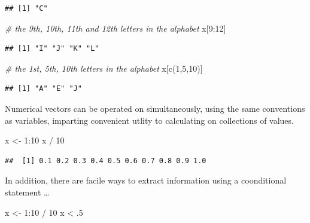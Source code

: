 \documentclass[
]{book}
\newenvironment{Shaded}{\begin{snugshade}}{\end{snugshade}}
\newcommand{\CommentTok}[1]{\textcolor[rgb]{0.56,0.35,0.01}{\textit{#1}}}
\newcommand{\DecValTok}[1]{\textcolor[rgb]{0.00,0.00,0.81}{#1}}
\newcommand{\FunctionTok}[1]{\textcolor[rgb]{0.00,0.00,0.00}{#1}}
\newcommand{\NormalTok}[1]{#1}
\newcommand{\OtherTok}[1]{\textcolor[rgb]{0.56,0.35,0.01}{#1}}
\newcommand{\SpecialCharTok}[1]{\textcolor[rgb]{0.00,0.00,0.00}{#1}}
\begin{document}
\begin{verbatim}
## [1] "C"
\end{verbatim}

\begin{Shaded}
\begin{Highlighting}[]
\CommentTok{\# the 9th, 10th, 11th and 12th letters in the alphabet}
\NormalTok{x[}\DecValTok{9}\SpecialCharTok{:}\DecValTok{12}\NormalTok{]}
\end{Highlighting}
\end{Shaded}

\begin{verbatim}
## [1] "I" "J" "K" "L"
\end{verbatim}

\begin{Shaded}
\begin{Highlighting}[]
\CommentTok{\# the 1st, 5th, 10th letters in the alphabet}
\NormalTok{x[}\FunctionTok{c}\NormalTok{(}\DecValTok{1}\NormalTok{,}\DecValTok{5}\NormalTok{,}\DecValTok{10}\NormalTok{)]}
\end{Highlighting}
\end{Shaded}

\begin{verbatim}
## [1] "A" "E" "J"
\end{verbatim}

Numerical vectors can be operated on simultaneously, using the same conventions as variables, imparting convenient utlity to calculating on collections of values.

\begin{Shaded}
\begin{Highlighting}[]
\NormalTok{x }\OtherTok{\textless{}{-}} \DecValTok{1}\SpecialCharTok{:}\DecValTok{10}
\NormalTok{x }\SpecialCharTok{/} \DecValTok{10}
\end{Highlighting}
\end{Shaded}

\begin{verbatim}
##  [1] 0.1 0.2 0.3 0.4 0.5 0.6 0.7 0.8 0.9 1.0
\end{verbatim}

In addition, there are facile ways to extract information using a coonditional statement \ldots{}

\begin{Shaded}
\begin{Highlighting}[]
\NormalTok{x }\OtherTok{\textless{}{-}} \DecValTok{1}\SpecialCharTok{:}\DecValTok{10} \SpecialCharTok{/} \DecValTok{10}
\NormalTok{x }\SpecialCharTok{\textless{}}\NormalTok{ .}\DecValTok{5}
\end{Highlighting}
\end{Shaded}
\end{document}
